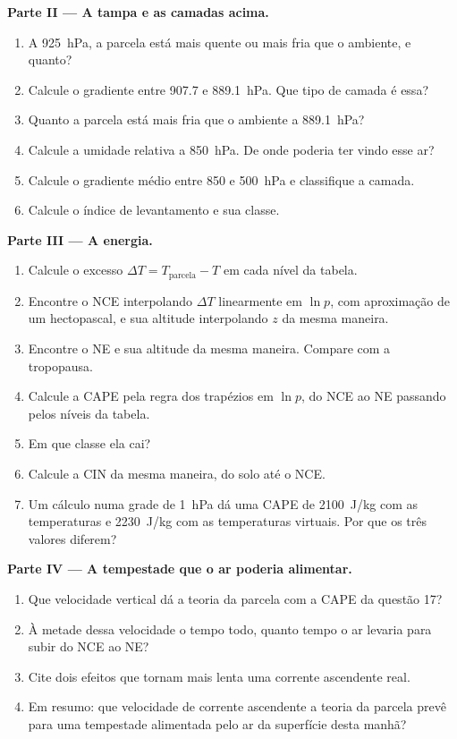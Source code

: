 \begin{problem}
\medskip\noindent\textbf{Parte II --- A tampa e as camadas acima.}
\begin{enumerate}[resume]
  \item A \qty{925}{hPa}, a parcela está mais quente ou mais fria que o ambiente, e quanto?
  \item Calcule o gradiente entre 907.7 e \qty{889.1}{hPa}. Que tipo de camada é essa?
  \item Quanto a parcela está mais fria que o ambiente a \qty{889.1}{hPa}?
  \item Calcule a umidade relativa a \qty{850}{hPa}. De onde poderia ter vindo esse ar?
  \item Calcule o gradiente médio entre 850 e \qty{500}{hPa} e classifique a camada.
  \item Calcule o índice de levantamento e sua classe.
\end{enumerate}

\medskip\noindent\textbf{Parte III --- A energia.}
\begin{enumerate}[resume]
  \item Calcule o excesso $\Delta T = T_{\text{parcela}} - T$ em cada nível da tabela.
  \item Encontre o NCE interpolando $\Delta T$ linearmente em $\ln p$, com aproximação de um hectopascal,
        e sua altitude interpolando $z$ da mesma maneira.
  \item Encontre o NE e sua altitude da mesma maneira. Compare com a tropopausa.
  \item Calcule a CAPE pela regra dos trapézios em $\ln p$, do NCE ao NE passando pelos
        níveis da tabela.
  \item Em que classe ela cai?
  \item Calcule a CIN da mesma maneira, do solo até o NCE.
  \item Um cálculo numa grade de \qty{1}{hPa} dá uma CAPE de \qty{2100}{J/kg} com as
        temperaturas e \qty{2230}{J/kg} com as temperaturas virtuais. Por que os três valores
        diferem?
\end{enumerate}

\medskip\noindent\textbf{Parte IV --- A tempestade que o ar poderia alimentar.}
\begin{enumerate}[resume]
  \item Que velocidade vertical dá a teoria da parcela com a CAPE da questão 17?
  \item À metade dessa velocidade o tempo todo, quanto tempo o ar levaria para subir do NCE ao NE?
  \item Cite dois efeitos que tornam mais lenta uma corrente ascendente real.
  \item Em resumo: que velocidade de corrente ascendente a teoria da parcela prevê para uma tempestade alimentada pelo
        ar da superfície desta manhã?
\end{enumerate}
\end{problem}
